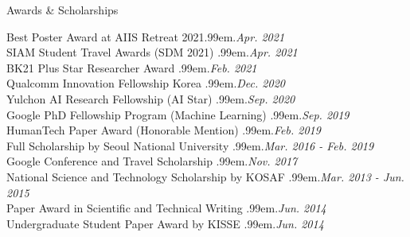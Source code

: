 \documentclass{resume} %
\makeatletter
\newcommand \Dotfill {\leavevmode \cleaders \hb@xt@ .99em{\hss .\hss }\hfill \kern \z@}
\makeatother
\begin{document}

\begin{rSection}{Awards \& Scholarships}

Best Poster Award at AIIS Retreat 2021\smallskip \Dotfill \emph{Apr. 2021} \\ 
SIAM Student Travel Awards (SDM 2021) \smallskip \Dotfill \emph{Apr. 2021} \\ 
BK21 Plus Star Researcher Award \smallskip \Dotfill \emph{Feb. 2021} \\ 
Qualcomm Innovation Fellowship Korea \smallskip \Dotfill \emph{Dec. 2020} \\ 
Yulchon AI Research Fellowship (AI Star) \smallskip \Dotfill \emph{Sep. 2020} \\ 
Google PhD Fellowship Program (Machine Learning) \smallskip \Dotfill \emph{Sep. 2019} \\ 
HumanTech Paper Award (Honorable Mention) \smallskip \Dotfill \emph{Feb. 2019} \\ 
Full Scholarship by Seoul National University \smallskip \Dotfill \emph{Mar. 2016 - Feb. 2019} \\ 
Google Conference and Travel Scholarship \smallskip \Dotfill \emph{Nov. 2017} \\ 
National Science and Technology Scholarship by KOSAF \smallskip \Dotfill \emph{Mar. 2013 - Jun. 2015} \\ 
Paper Award in Scientific and Technical Writing \smallskip \Dotfill \emph{Jun. 2014} \\ 
Undergraduate Student Paper Award by KISSE \smallskip \Dotfill \emph{Jun. 2014}

\end{rSection}

\end{document}
